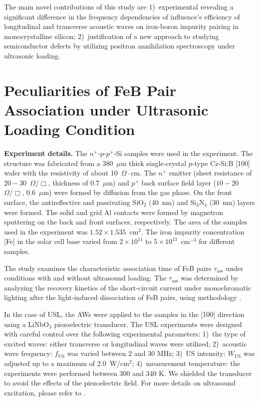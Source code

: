 \documentclass{ttp}
\begin{document}
The main novel contributions of this study are
1)~experimental revealing a significant difference in the frequency dependencies 
of influence's efficiency of longitudinal and transverse acoustic waves on iron-boron impurity pairing in monocrystalline silicon;
2)~justification of a new approach to studying semiconductor defects by utilizing positron annihilation spectroscopy under ultrasonic loading.

\section{Peculiarities of FeB Pair Association under Ultrasonic Loading Condition}

\noindent \textbf{Experiment details.}
The $n^+$-$p$-$p^+$-Si samples were used in the experiment.
The structure was fabricated from a 380~$\mu$m thick single-crystal
$p$-type Cz-Si:B [100] wafer
with the resistivity of about 10~$\Omega\cdot$cm.
The $n^+$ emitter (sheet resistance of $20-30$~$\Omega/\Box$,
thickness of $0.7$~$\mu$m) and $p^+$ back surface field layer ($10-20$~$\Omega/\Box$, $0.6$~$\mu$m) were formed by diffusion from the gas phase.
On the front surface, the antireflective and passivating SiO$_2$ (40~nm) and Si$_3$N$_4$ (30~nm) layers
were formed.
The solid and grid Al contacts were formed by magnetron sputtering on the back and front surfaces, respectively.
The area of the samples used in the experiment was $1.52\times1.535$~cm$^2$.
The iron impurity concentration [Fe] in the solar cell base varied from $2\times10^{11}$ to $5\times10^{13}$~cm$^{-3}$ for different samples.

The study examines the characteristic association time of FeB pairs $\tau_\mathrm{ass}$ under conditions with and without ultrasound loading.
The $\tau_\mathrm{ass}$ was determined by analyzing the recovery kinetics of the  short-circuit current under monochromatic lighting
after  the light-induced dissociation of FeB pairs, using methodology \cite{Olikh2021JAP, Olikh2022:JMatSci}.

In the case of USL, the AWs were applied to the samples in the [100] direction using a LiNbO$_3$ piezoelectric transducer.
The USL experiments were designed with careful control over the following experimental parameters:
1)~the type of excited waves: either transverse or longitudinal waves were utilized;
2)~acoustic wave frequency: $f_\mathrm{US}$ was varied between 2 and 30 MHz;
3)~US intensity: $W_\mathrm{US}$ was adjusted up to a maximum of 2.0~W/cm$^2$;
4)~measurement temperature: the experiments were performed between 300 and 340 K.
We shielded the transducer to avoid the effects of the piezoelectric field.
For more details on ultrasound excitation, please refer to \cite{Olikh2021JAP, Olikh2022:JMatSci}.
\end{document}
